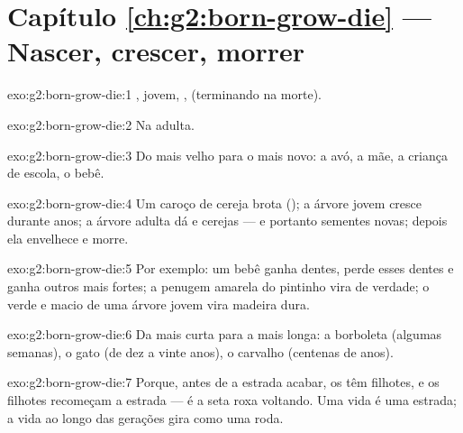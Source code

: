 \section*{Capítulo \ref{ch:g2:born-grow-die} --- Nascer, crescer, morrer}

\begin{solution}{exo:g2:born-grow-die:1}
, jovem, ,  (terminando na morte).
\end{solution}

\begin{solution}{exo:g2:born-grow-die:2}
Na  adulta.
\end{solution}

\begin{solution}{exo:g2:born-grow-die:3}
Do mais velho para o mais novo: a avó, a mãe, a criança de escola, o
bebê.
\end{solution}

\begin{solution}{exo:g2:born-grow-die:4}
Um caroço de cereja brota (); a árvore jovem cresce
durante anos; a árvore adulta dá  e cerejas --- e portanto
sementes novas; depois ela envelhece e morre.
\end{solution}

\begin{solution}{exo:g2:born-grow-die:5}
Por exemplo: um bebê ganha dentes, perde esses dentes e ganha outros
mais fortes; a penugem amarela do pintinho vira  de verdade; o
 verde e macio de uma árvore jovem vira madeira dura.
\end{solution}

\begin{solution}{exo:g2:born-grow-die:6}
Da mais curta para a mais longa: a borboleta (algumas semanas), o
gato (de dez a vinte anos), o carvalho (centenas de anos).
\end{solution}

\begin{solution}{exo:g2:born-grow-die:7}
Porque, antes de a estrada acabar, os  têm filhotes, e os
filhotes recomeçam a estrada --- é a seta roxa voltando. Uma vida é
uma estrada; a vida ao longo das gerações gira como uma roda.
\end{solution}

